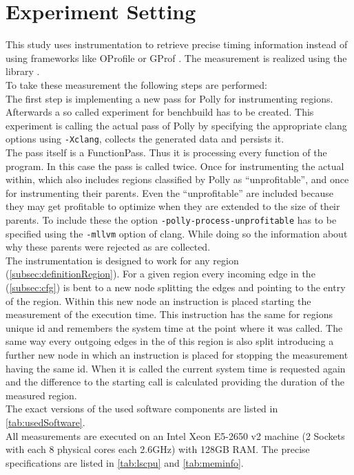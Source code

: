 \section{Experiment Setting}\label{sec:experimentSettings}
\begin{sloppypar}
    This study uses instrumentation to retrieve precise timing information instead of using frameworks like OProfile \cite{oprofile} or GProf \cite{gprof}.
    The measurement is realized using the \papi library \cite{papi}.\\
    To take these measurement the following steps are performed:\\
    The first step is implementing a new pass for Polly for instrumenting regions.
    Afterwards a so called experiment for benchbuild has to be created.
    This experiment is calling the actual pass of Polly by specifying the appropriate clang options using \texttt{-Xclang}, collects the generated data and persists it.\\
    The pass itself is a FunctionPass.
    Thus it is processing every function of the program.
    In this case the pass is called twice.
    Once for instrumenting the actual \scops within, which also includes regions classified by Polly as \enquote{unprofitable}, and once for instrumenting their parents.
    Even the \enquote{unprofitable} \scops are included because they may get profitable to optimize when they are extended to the size of their parents.
    To include these \scops the option \texttt{-polly-process-unprofitable} has to be specified using the \texttt{-mllvm} option of clang.
    While doing so the information about why these parents were rejected as \scops are collected.\\
    The instrumentation is designed to work for any region (\autoref{subsec:definitionRegion}).
    For a given region every incoming edge in the \cfg (\autoref{subsec:cfg}) is bent to a new node splitting the edges and pointing to the entry of the region.
    Within this new node an instruction is placed starting the measurement of the execution time.
    This instruction has the same for regions unique id and remembers the system time at the point where it was called.
    The same way every outgoing edges in the \cfg of this region is also split introducing a further new node in which an instruction is placed for stopping the measurement having the same id.
    When it is called the current system time is requested again and the difference to the starting call is calculated providing the duration of the measured region.\\
    The exact versions of the used software components are listed in \autoref{tab:usedSoftware}.\\
    All measurements are executed on an Intel Xeon E5-2650 v2 machine (2 Sockets with each 8 physical cores each 2.6GHz) with 128GB RAM.
    The precise specifications are listed in \autoref{tab:lscpu} and \autoref{tab:meminfo}.
\end{sloppypar}
